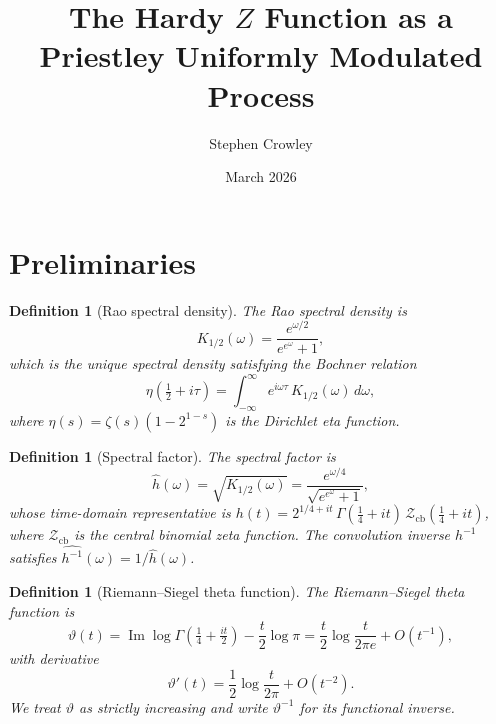 \documentclass[11pt,a4paper]{article}
\title{The Hardy $Z$ Function as a Priestley Uniformly Modulated Process}
\author{Stephen Crowley}
\date{March 2026}
\newtheorem{definition}[theorem]{Definition}
\begin{document}
\maketitle

\section{Preliminaries}

\begin{definition}[Rao spectral density]
\label{def:rao}
The Rao spectral density is
\begin{equation}
K_{1/2}(\omega) = \frac{e^{\omega/2}}{e^{e^\omega}+1},
\end{equation}
which is the unique spectral density satisfying the Bochner relation
\begin{equation}
\eta\!\left(\tfrac{1}{2}+i\tau\right)
= \int_{-\infty}^{\infty} e^{i\omega\tau}\,K_{1/2}(\omega)\,d\omega,
\end{equation}
where $\eta(s)=\zeta(s)(1-2^{1-s})$ is the Dirichlet eta function.
\end{definition}

\begin{definition}[Spectral factor]
\label{def:spectral-factor}
The spectral factor is
\begin{equation}
\hat{h}(\omega) = \sqrt{K_{1/2}(\omega)}
= \frac{e^{\omega/4}}{\sqrt{e^{e^\omega}+1}},
\end{equation}
whose time-domain representative is
$h(t)=2^{1/4+it}\,\Gamma(\tfrac{1}{4}+it)\,\mathcal{Z}_{\mathrm{cb}}(\tfrac{1}{4}+it)$,
where $\mathcal{Z}_{\mathrm{cb}}$ is the central binomial zeta function.
The convolution inverse $h^{-1}$ satisfies $\widehat{h^{-1}}(\omega)=1/\hat{h}(\omega)$.
\end{definition}

\begin{definition}[Riemann--Siegel theta function]
\label{def:vartheta}
The Riemann--Siegel theta function is
\begin{equation}
\vartheta(t) = \operatorname{Im}\!\log\Gamma\!\left(\tfrac{1}{4}+\tfrac{it}{2}\right)
- \frac{t}{2}\log\pi
= \frac{t}{2}\log\frac{t}{2\pi e} + O(t^{-1}),
\end{equation}
with derivative
\begin{equation}
\label{eq:vartheta-prime}
\vartheta'(t) = \frac{1}{2}\log\frac{t}{2\pi} + O(t^{-2}).
\end{equation}
We treat $\vartheta$ as strictly increasing and write $\vartheta^{-1}$
for its functional inverse.
\end{definition}
\end{document}

